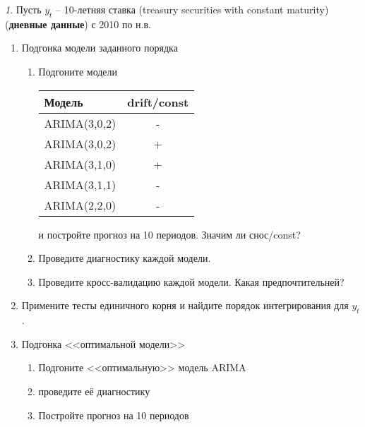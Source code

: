 \documentclass[12pt]{article}
\theoremstyle{remark}
\newtheorem{exercise}{}[subsection]
\begin{document}
\begin{exercise}
Пусть \(y_t\) -- 10-летняя ставка (treasury securities with constant matu\-ri\-ty) 
(\textbf{дневные данные}) с 2010 по н.в.
\begin{enumerate}
	\item Подгонка модели заданного порядка
	\begin{enumerate}
		\item Подгоните модели
		\begin{center}
		\begin{tabular}{l|c}
			Модель & drift/const \\ \hline
			ARIMA(3,0,2) & - \\
			ARIMA(3,0,2) & + \\
			ARIMA(3,1,0) & + \\
			ARIMA(3,1,1) & - \\
			ARIMA(2,2,0) & - \\ \hline
		\end{tabular}
		\end{center} 
		и постройте прогноз на 10 периодов. Значим ли снос/const?
		\item Проведите диагностику каждой модели.
		\item Проведите кросс-валидацию каждой модели. Какая предпочтительней?
	\end{enumerate}
	\item Примените тесты единичного корня и найдите порядок интегрирования для \(y_t\). 
	\item Подгонка <<оптимальной модели>>
	\begin{enumerate}
		\item Подгоните <<оптимальную>> модель ARIMA
		\item проведите её диагностику
		\item Постройте прогноз на 10 периодов
	\end{enumerate}
\end{enumerate}
\end{exercise}
\end{document}

